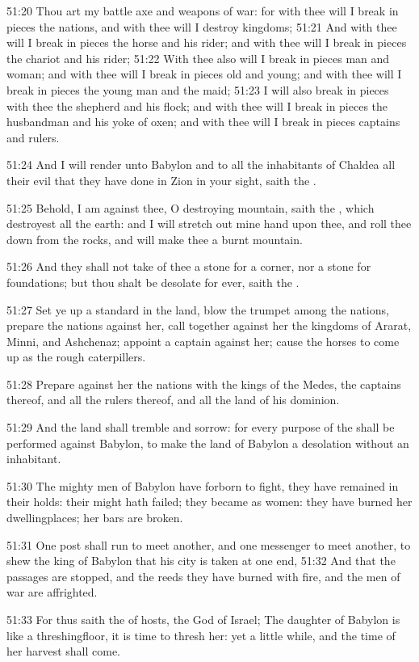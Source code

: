 51:20 Thou art my battle axe and weapons of war: for with thee will I
break in pieces the nations, and with thee will I destroy kingdoms;
51:21 And with thee will I break in pieces the horse and his rider;
and with thee will I break in pieces the chariot and his rider; 51:22
With thee also will I break in pieces man and woman; and with thee
will I break in pieces old and young; and with thee will I break in
pieces the young man and the maid; 51:23 I will also break in pieces
with thee the shepherd and his flock; and with thee will I break in
pieces the husbandman and his yoke of oxen; and with thee will I break
in pieces captains and rulers.

51:24 And I will render unto Babylon and to all the inhabitants of
Chaldea all their evil that they have done in Zion in your sight,
saith the \LORD.

51:25 Behold, I am against thee, O destroying mountain, saith the
\LORD, which destroyest all the earth: and I will stretch out mine hand
upon thee, and roll thee down from the rocks, and will make thee a
burnt mountain.

51:26 And they shall not take of thee a stone for a corner, nor a
stone for foundations; but thou shalt be desolate for ever, saith the
\LORD.

51:27 Set ye up a standard in the land, blow the trumpet among the
nations, prepare the nations against her, call together against her
the kingdoms of Ararat, Minni, and Ashchenaz; appoint a captain
against her; cause the horses to come up as the rough caterpillers.

51:28 Prepare against her the nations with the kings of the Medes, the
captains thereof, and all the rulers thereof, and all the land of his
dominion.

51:29 And the land shall tremble and sorrow: for every purpose of the
\LORD shall be performed against Babylon, to make the land of Babylon a
desolation without an inhabitant.

51:30 The mighty men of Babylon have forborn to fight, they have
remained in their holds: their might hath failed; they became as
women: they have burned her dwellingplaces; her bars are broken.

51:31 One post shall run to meet another, and one messenger to meet
another, to shew the king of Babylon that his city is taken at one
end, 51:32 And that the passages are stopped, and the reeds they have
burned with fire, and the men of war are affrighted.

51:33 For thus saith the \LORD of hosts, the God of Israel; The
daughter of Babylon is like a threshingfloor, it is time to thresh
her: yet a little while, and the time of her harvest shall come.

